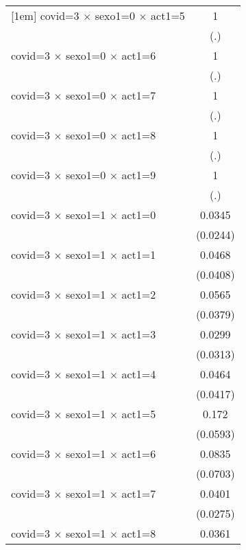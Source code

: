 {\begin{tabular}{l*{1}{c}}
[1em]
covid=3 $\times$ sexo1=0 $\times$ act1=5&           1         \\
                    &         (.)         \\
[1em]
covid=3 $\times$ sexo1=0 $\times$ act1=6&           1         \\
                    &         (.)         \\
[1em]
covid=3 $\times$ sexo1=0 $\times$ act1=7&           1         \\
                    &         (.)         \\
[1em]
covid=3 $\times$ sexo1=0 $\times$ act1=8&           1         \\
                    &         (.)         \\
[1em]
covid=3 $\times$ sexo1=0 $\times$ act1=9&           1         \\
                    &         (.)         \\
[1em]
covid=3 $\times$ sexo1=1 $\times$ act1=0&      0.0345\sym{***}\\
                    &    (0.0244)         \\
[1em]
covid=3 $\times$ sexo1=1 $\times$ act1=1&      0.0468\sym{***}\\
                    &    (0.0408)         \\
[1em]
covid=3 $\times$ sexo1=1 $\times$ act1=2&      0.0565\sym{***}\\
                    &    (0.0379)         \\
[1em]
covid=3 $\times$ sexo1=1 $\times$ act1=3&      0.0299\sym{***}\\
                    &    (0.0313)         \\
[1em]
covid=3 $\times$ sexo1=1 $\times$ act1=4&      0.0464\sym{***}\\
                    &    (0.0417)         \\
[1em]
covid=3 $\times$ sexo1=1 $\times$ act1=5&       0.172\sym{***}\\
                    &    (0.0593)         \\
[1em]
covid=3 $\times$ sexo1=1 $\times$ act1=6&      0.0835\sym{**} \\
                    &    (0.0703)         \\
[1em]
covid=3 $\times$ sexo1=1 $\times$ act1=7&      0.0401\sym{***}\\
                    &    (0.0275)         \\
[1em]
covid=3 $\times$ sexo1=1 $\times$ act1=8&      0.0361\sym{***}\\

\end{tabular}}
